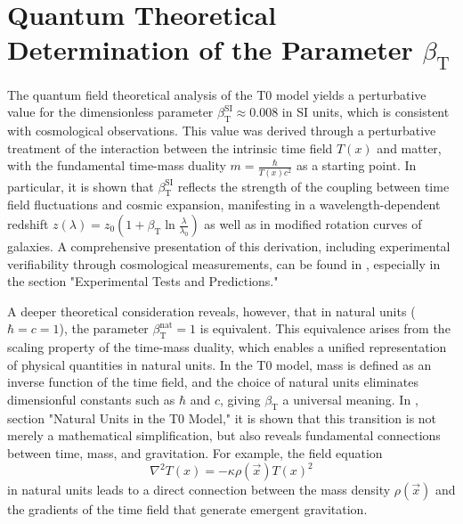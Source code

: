 ﻿\documentclass[12pt,a4paper]{article}
\newcommand{\Tfield}{T(x)}
\newcommand{\betaT}{\beta_{\text{T}}}
\newcommand{\vecx}{\vec{x}}
\begin{document}
	\section{Quantum Theoretical Determination of the Parameter \(\betaT\)}
	
	The quantum field theoretical analysis of the T0 model yields a perturbative value for the dimensionless parameter \(\betaT^{\text{SI}} \approx 0.008\) in SI units, which is consistent with cosmological observations. This value was derived through a perturbative treatment of the interaction between the intrinsic time field \(\Tfield\) and matter, with the fundamental time-mass duality \(m = \frac{\hbar}{\Tfield c^2}\) as a starting point. In particular, it is shown that \(\betaT^{\text{SI}}\) reflects the strength of the coupling between time field fluctuations and cosmic expansion, manifesting in a wavelength-dependent redshift \(z(\lambda) = z_0 \left(1 + \betaT \ln \frac{\lambda}{\lambda_0}\right)\) as well as in modified rotation curves of galaxies. A comprehensive presentation of this derivation, including experimental verifiability through cosmological measurements, can be found in \cite{pascher_emergente_gravitation_2025}, especially in the section "Experimental Tests and Predictions."
	
	A deeper theoretical consideration reveals, however, that in natural units (\(\hbar = c = 1\)), the parameter \(\betaT^{\text{nat}} = 1\) is equivalent. This equivalence arises from the scaling property of the time-mass duality, which enables a unified representation of physical quantities in natural units. In the T0 model, mass is defined as an inverse function of the time field, and the choice of natural units eliminates dimensionful constants such as \(\hbar\) and \(c\), giving \(\betaT\) a universal meaning. In \cite{pascher_emergente_gravitation_2025}, section "Natural Units in the T0 Model," it is shown that this transition is not merely a mathematical simplification, but also reveals fundamental connections between time, mass, and gravitation. For example, the field equation 
	\begin{equation}
		\nabla^2 \Tfield = -\kappa \rho(\vecx) \Tfield^2
	\end{equation}
	in natural units leads to a direct connection between the mass density \(\rho(\vecx)\) and the gradients of the time field that generate emergent gravitation.
	
\end{document}
